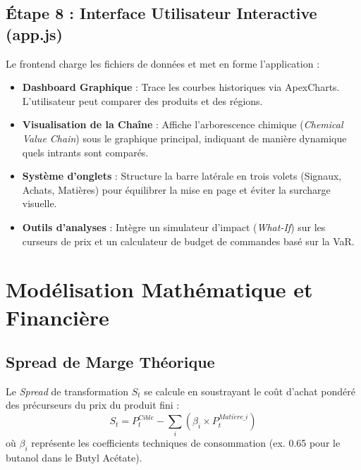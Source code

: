\documentclass[12pt,a4paper]{article}
\begin{document}
\subsection{Étape 8 : Interface Utilisateur Interactive (app.js)}
Le frontend charge les fichiers de données et met en forme l'application :
\begin{itemize}
    \item \textbf{Dashboard Graphique} : Trace les courbes historiques via ApexCharts. L'utilisateur peut comparer des produits et des régions.
    \item \textbf{Visualisation de la Chaîne} : Affiche l'arborescence chimique (\textit{Chemical Value Chain}) sous le graphique principal, indiquant de manière dynamique quels intrants sont comparés.
    \item \textbf{Système d'onglets} : Structure la barre latérale en trois volets (Signaux, Achats, Matières) pour équilibrer la mise en page et éviter la surcharge visuelle.
    \item \textbf{Outils d'analyses} : Intègre un simulateur d'impact (\textit{What-If}) sur les curseurs de prix et un calculateur de budget de commandes basé sur la VaR.
\end{itemize}

\section{Modélisation Mathématique et Financière}

\subsection{Spread de Marge Théorique}
Le \textit{Spread} de transformation $S_t$ se calcule en soustrayant le coût d'achat pondéré des précurseurs du prix du produit fini :
\begin{equation}
S_t = P^{Cible}_t - \sum_{i} \left( \beta_i \times P^{Mati\grave{e}re\_i}_t \right)
\end{equation}
où $\beta_i$ représente les coefficients techniques de consommation (ex. 0.65 pour le butanol dans le Butyl Acétate).
\end{document}
